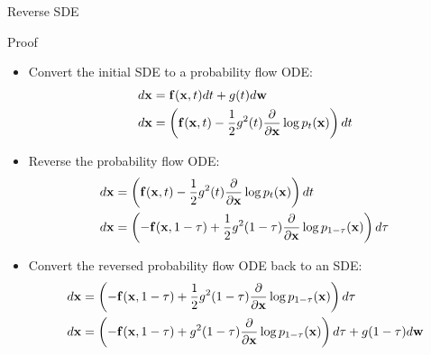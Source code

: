 \documentclass{beamer}
\begin{document}
\begin{frame}{Reverse SDE}
	\begin{block}{Proof}
		\begin{itemize}
			\item Convert the initial SDE to a probability flow ODE:
			\vspace{-0.1cm}
			{\footnotesize
			\begin{align*}
				d\mathbf{x} &= \mathbf{f}(\mathbf{x}, t) dt + g(t) d \mathbf{w} \\
				d\mathbf{x} &= \left(\mathbf{f}(\mathbf{x}, t) -\frac{1}{2} g^2(t) \frac{\partial}{\partial \mathbf{x}} \log p_t(\mathbf{x}) \right) dt
			\end{align*}
			}
			\item Reverse the probability flow ODE:
			\vspace{-0.1cm}
			{\footnotesize
			\begin{align*}
				d\mathbf{x} &= \left(\mathbf{f}(\mathbf{x}, t) -\frac{1}{2} g^2(t) \frac{\partial}{\partial \mathbf{x}} \log p_t(\mathbf{x}) \right) dt \\
				d\mathbf{x} &= \left(-\mathbf{f}(\mathbf{x}, 1 - \tau) + \frac{1}{2} g^2(1 - \tau) \frac{\partial}{\partial \mathbf{x}} \log p_{1 - \tau}(\mathbf{x}) \right) d\tau
			\end{align*}
			}
			\item Convert the reversed probability flow ODE back to an SDE:
			\vspace{-0.1cm}
			{\footnotesize
			\begin{align*}
				d\mathbf{x} &= \left(-\mathbf{f}(\mathbf{x}, 1 - \tau) + \frac{1}{2} g^2(1 - \tau) \frac{\partial}{\partial \mathbf{x}} \log p_{1 - \tau}(\mathbf{x}) \right) d \tau \\
				d\mathbf{x} &= \left(-\mathbf{f}(\mathbf{x}, 1 - \tau) + g^2(1 - \tau) \frac{\partial}{\partial \mathbf{x}} \log p_{1 - \tau}(\mathbf{x}) \right) d \tau + g(1-\tau)d\mathbf{w}
			\end{align*}
			}
		\end{itemize}
	\end{block}
\end{frame}
\end{document}
